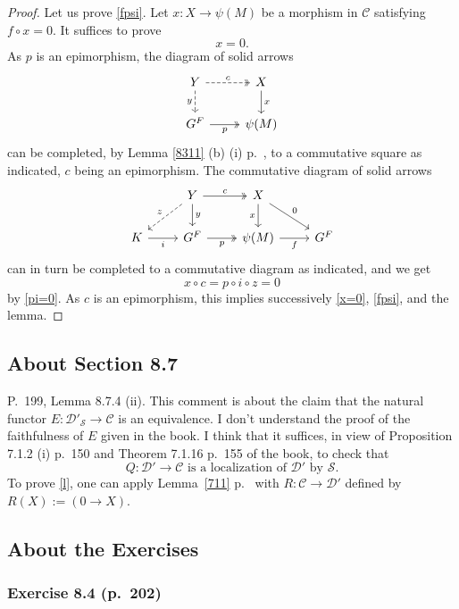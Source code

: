 \documentclass[12pt]{article}
\theoremstyle{remark}
\theoremstyle{definition}
\newcommand{\cc}{\mathcal}
\newcommand{\C}{\mathcal C}
\begin{document}
\begin{proof}
Let us prove \eqref{fpsi}. Let $x:X\to\psi(M)$ be a morphism in $\C$ satisfying $f\circ x=0$. It suffices to prove 
%
\begin{equation}\label{x=0}
x=0.
\end{equation}
% 
As $p$ is an epimorphism, the diagram of solid arrows 
$$
\begin{tikzcd}
Y\ar[dashed]{d}[swap]{y}\ar[dashed, two heads]{r}{c}&X\ar{d}{x}\\ 
G^F\ar[two heads]{r}[swap]{p}&\psi(M)
\end{tikzcd}
$$ 
can be completed, by Lemma \ref{8311} (b) (i) p.~\pageref{8311}, to a commutative square as indicated, $c$ being an epimorphism. The commutative diagram of solid arrows 
$$
\begin{tikzcd}
{}&Y\ar[dashed]{dl}[swap]{z}\ar{d}{y}\ar[two heads]{r}{c}&X\ar{d}[swap]{x}\ar{dr}{0}\\ 
K\ar{r}[swap]{i}&G^F\ar[two heads]{r}[swap]{p}&\psi(M)\ar{r}[swap]{f}&G^F
\end{tikzcd}
$$ 
can in turn be completed to a commutative diagram as indicated, and we get 
$$
x\circ c=p\circ i\circ z=0 
$$  
by \eqref{pi=0}. As $c$ is an epimorphism, this implies successively \eqref{x=0}, \eqref{fpsi}, and the lemma. 
\end{proof}


\subsection{About Section 8.7}


P.~199, Lemma 8.7.4 (ii). This comment is about the claim that the natural functor $E:\cc D'_{\cc S}\to\C$ is an equivalence. I don't understand the proof of the faithfulness of $E$ given in the book. I think that it suffices, in view of Proposition 7.1.2 (i) p.~150 and Theorem 7.1.16 p.~155 of the book, to check that
%
\begin{equation}\label{l}
Q:\cc D'\to\C\text{ is a localization of }\cc D'\text{ by }\cc S.
\end{equation}
%
To prove \eqref{l}, one can apply Lemma~\ref{711} p.~\pageref{711} with $R:\C\to\cc D'$ defined by $R(X):=(0\to X)$. 


\subsection{About the Exercises} 

\subsubsection{Exercise 8.4 (p.~202)}
\end{document}
